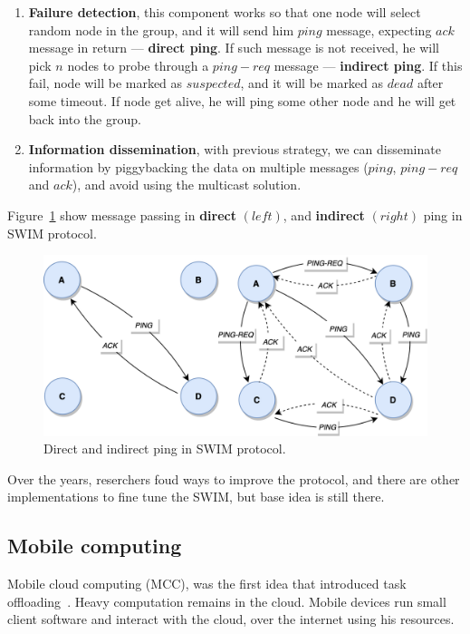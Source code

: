 \begin{enumerate}[start=1,label={(\bfseries \arabic*)}]
	\item \textbf{Failure detection}, this component works so that one node will select random node in the group, and it will send him $ping$ message, expecting $ack$ message in return --- \textbf{direct ping}. If such message is not received, he will pick $n$ nodes to probe through a $ping-req$ message --- \textbf{indirect ping}. If this fail, node will be marked as $suspected$, and it will be marked as $dead$ after some timeout. If node get alive, he will ping some other node and he will get back into the group.
	\item \textbf{Information dissemination}, with previous strategy, we can disseminate information by piggybacking the data on multiple messages ($ping$, $ping-req$ and $ack$), and avoid using the multicast solution.
\end{enumerate}

\noindent
Figure~\ref{fig:fig15} show message passing in \textbf{direct} $(left)$, and \textbf{indirect} $(right)$ ping in SWIM protocol.

\begin{figure}[H]
	\begin{center}
		\includegraphics[scale=0.7]{images/Figure15.png}
	\end{center}
	\vspace{-0.6cm}
	\caption{Direct and indirect ping in SWIM protocol.}
	\label{fig:fig15}
\end{figure}

Over the years, reserchers foud ways to improve the protocol, and there are other implementations to fine tune the SWIM, but base idea is still there.
%
%
\subsection{Mobile computing}\label{sec:mobile_computing}
%
Mobile cloud computing (MCC), was the first idea that introduced task offloading~\cite{FernandoLR13, LinLJL19}. Heavy computation remains in the cloud. Mobile devices run small client software and interact with the cloud, over the internet using his resources. 

